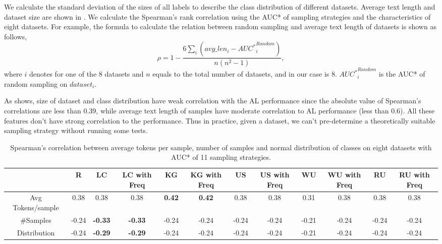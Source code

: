We calculate the standard deviation of the sizes of all labels to describe the class distribution of different datasets. Average text length and dataset size are shown in .  We calculate the Spearman's rank correlation using the AUC* of sampling strategies and the characteristics of eight datasets. For example, the formula to calculate the relation between random sampling and average text length of datasets is shown as follows,
\begin{equation}
    \rho = 1 - \frac{6\sum_i(avg\_len_i - {AUC^*}^{Random}_{i})}{n(n^2 - 1)},
\end{equation}
where $i$ denotes for one of the 8 datasets and $n$ equals to the total number of datasets, 
and in our case is 8. ${AUC^*}^{Random}_{i}$ is the AUC* of random sampling on $dataset_i$.

As  shows, size of dataset and class distribution have weak correlation with the AL performance since the absolute value of Spearman's correlations are less than 0.39, while average text length of samples have moderate correlation to AL performance (less than 0.6). All these features don't have strong correlation to the performance. Thus in practice, given a dataset, we can't pre-determine a theoretically suitable sampling strategy without 
running some tests.

\begin{table}[th]
	\small
	\centering
	\begin{tabular}{cccccccccccc}
		\toprule
		 &  R & LC & LC with Freq & KG & KG with Freq & US & US with Freq & WU & WU with Freq & RU & RU with Freq\\\hline
		Avg Tokens/sample & 0.38 & 0.38 & 0.38 & \textbf{0.42} & \textbf{0.42} & 0.38 & 0.38 & 0.31 & 0.38 & 0.38 & 0.38 \\
		\#Samples & -0.24 & \textbf{-0.33} & \textbf{-0.33} & -0.24 & -0.24 & -0.24 & -0.24 & -0.21 & -0.24 &-0.24 & -0.24\\
		Distribution & -0.24 & \textbf{-0.29} &\textbf{ -0.29} & -0.24 & -0.24 & -0.24 & -0.24 & -0.21 & -0.24 & -0.24& -0.24 \\ 
		\bottomrule              
	\end{tabular}
\caption{Spearman's correlation between average tokens per sample, number of samples and normal distribution of classes on eight datasets with AUC* of 11 sampling strategies.}
\label{table:correkationOfDataset}
\end{table}

